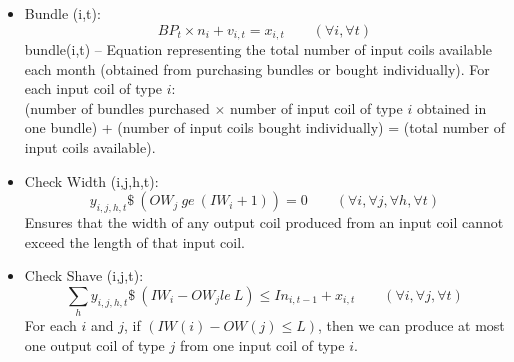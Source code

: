 \documentclass{article}[12pt]
\begin{document}
{\begin{itemize}
\item Bundle (i,t): \\
\begin{displaymath}
BP_{t} \times n_{i} + v_{i,t} = x_{i,t} \qquad (\forall i, \forall t)
\end{displaymath}
bundle(i,t) -- Equation representing the total number of input coils available each month (obtained from purchasing bundles or bought individually). For each input coil of type $i$:\\ (number of bundles purchased $\times$ number of input coil of type $i$ obtained in one bundle) + (number of input coils bought individually) = (total number of input coils available). \\

\item Check Width (i,j,h,t): \\
\begin{displaymath}
y_{i,j,h,t}\$\ (OW_{j}\ ge\ (IW_{i} + 1)) = 0 \qquad (\forall i, \forall j, \forall h, \forall t)
\end{displaymath}
Ensures that the width of any output coil produced from an input coil cannot exceed the length of that input coil. \\

\item Check Shave (i,j,t): \\
\begin{displaymath}
\sum_{h} y_{i,j,h,t} \$\ (IW_{i} - OW_{j}  le\ L) \leq In_{i,t-1} + x_{i,t} \qquad (\forall i, \forall j, \forall t)
\end{displaymath}
For each $i$ and $j$, if $(IW(i) - OW(j) \le L)$, then we can produce at most one output coil of type $j$ from one input coil of type $i$.\\


\end{itemize}

}
\end{document}
